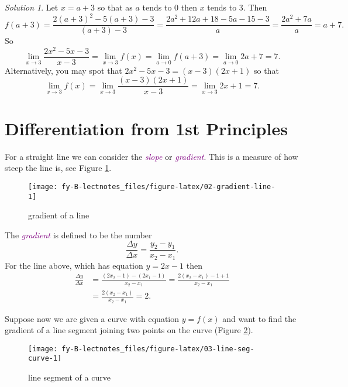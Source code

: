\documentclass[
  english,
  11pt,
  oneside]{book}
\newcommand{\slide}{}
\theoremstyle{definition}
\theoremstyle{definition}
\theoremstyle{definition}
\theoremstyle{definition}
\theoremstyle{remark}
\newtheorem*{solution}{Solution}
\begin{document}
\begin{solution}
Let \(x = a+3\) so that as \(a\) tends to \(0\) then \(x\) tends to \(3\). Then
\[
f(a+3) = \frac{2(a+3)^2-5(a+3)-3}{(a+3)-3}=\frac{2a^2+12a+18-5a-15-3}{a}=\frac{2a^2+7a}{a} = a+7.
\]
So
\[
\lim\limits_{x\to3}\frac{2x^2-5x-3}{x-3} = \lim\limits_{x\to3}f(x) = \lim\limits_{a\to0}f(a+3) = \lim\limits_{a\to0}2a+7 = 7.
\]
Alternatively, you may spot that \(2x^2-5x-3 = (x-3)(2x+1)\) so that
\[
\lim\limits_{x\to 3}f(x) = \lim\limits_{x\to3}\frac{(x-3)(2x+1)}{x-3} = \lim\limits_{x\to3}2x+1 = 7.
\]
\end{solution}

\slide

\section{Differentiation from 1st Principles}\label{lecture-two}

For a straight line we can consider the \textcolor{purple}{\em slope} or \textcolor{purple}{\em gradient}. This is a measure of how steep the line is, see Figure \ref{fig:02-gradient-line}.

\begin{figure}

{\centering \texttt{[image: fy-B-lectnotes\_files/figure-latex/02-gradient-line-1]} 

}

\caption{gradient of a line}\label{fig:02-gradient-line}
\end{figure}

\slide

The \textcolor{purple}{\em gradient} is defined to be the number
\[
\frac{\Delta y}{\Delta x} = \frac{y_2-y_1}{x_2-x_1}.
\]
For the line above, which has equation \(y = 2x-1\) then
\begin{align*}
\frac{\Delta y}{\Delta x} &= \frac{(2x_2-1)-(2x_1-1)}{x_2-x_1} = \frac{2(x_2-x_1)-1+1}{x_2-x_1}\\ &= \frac{2(x_2-x_1)}{x_2-x_1} = 2.
\end{align*}

\slide

Suppose now we are given a curve with equation \(y=f(x)\) and want to find the gradient of a line segment joining two points on the curve (Figure \ref{fig:03-line-seg-curve}).

\begin{figure}

{\centering \texttt{[image: fy-B-lectnotes\_files/figure-latex/03-line-seg-curve-1]} 

}

\caption{line segment of a curve}\label{fig:03-line-seg-curve}
\end{figure}
\end{document}
